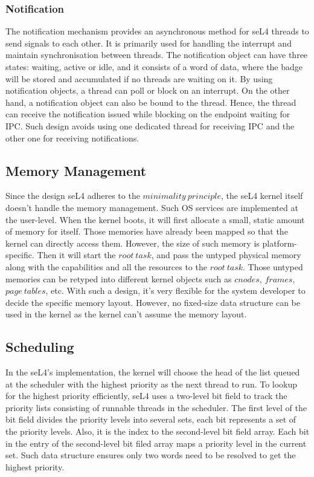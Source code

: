 \subsubsection{Notification}

The notification mechanism provides an asynchronous method for seL4 threads to send signals to each other. It is primarily used for handling the interrupt and maintain synchronisation between threads. The notification object can have three states: waiting, active or idle, and it consists of a word of data, where the badge will be stored and accumulated if no threads are waiting on it. By using notification objects, a thread can poll or block on an interrupt. On the other hand, a notification object can also be bound to the thread. Hence, the thread can receive the notification issued while blocking on the endpoint waiting for IPC. Such design avoids using one dedicated thread for receiving IPC and the other one for receiving notifications.

\subsection{Memory Management}

Since the design seL4 adheres to the $minimality\  principle$, the seL4 kernel itself doesn't handle the memory management. Such OS services are implemented at the user-level. When the kernel boots, it will first allocate a small, static amount of memory for itself. Those memories have already been mapped so that the kernel can directly access them. However, the size of such memory is platform-specific. Then it will start the $root\ task$, and pass the untyped physical memory along with the capabilities and all the resources to the $root\ task$. Those untyped memories can be retyped into different kernel objects such as $cnodes$, $frames$, $page\ tables$, etc. With such a design, it's very flexible for the system developer to decide the specific memory layout. However, no fixed-size data structure can be used in the kernel as the kernel can't assume the memory layout.

\subsection{Scheduling}

In the seL4's implementation, the kernel will choose the head of the list queued at the scheduler with the highest priority as the next thread to run. To lookup for the highest priority efficiently, seL4 uses a two-level bit field to track the priority lists consisting of runnable threads in the scheduler. The first level of the bit field divides the priority levels into several sets, each bit represents a set of the priority levels. Also, it is the index to the second-level bit field array. Each bit in the entry of the second-level bit filed array maps a priority level in the current set. Such data structure ensures only two words need to be resolved to get the highest priority.

